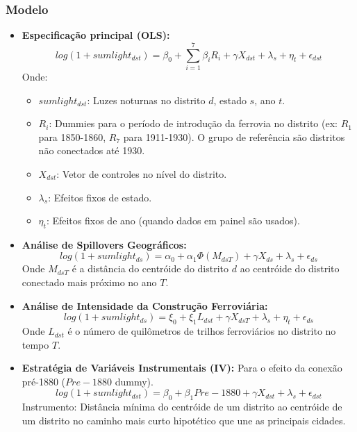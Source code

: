 \documentclass[12pt]{article}
\begin{document}
\subsubsection*{Modelo}
\begin{itemize}
    \item \textbf{Especificação principal (OLS):}
    \begin{equation} \label{eq:maitra_main}
        log(1+sumlight_{dst})=\beta_{0}+\sum_{i=1}^{7}\beta_{i}R_{i}+\gamma X_{dst}+\lambda_{s}+\eta_{t}+\epsilon_{dst}
    \end{equation}
    Onde:
    \begin{itemize}
        \item $sumlight_{dst}$: Luzes noturnas no distrito $d$, estado $s$, ano $t$.
        \item $R_i$: Dummies para o período de introdução da ferrovia no distrito (ex: $R_1$ para 1850-1860, $R_7$ para 1911-1930). O grupo de referência são distritos não conectados até 1930.
        \item $X_{dst}$: Vetor de controles no nível do distrito.
        \item $\lambda_s$: Efeitos fixos de estado.
        \item $\eta_t$: Efeitos fixos de ano (quando dados em painel são usados).
    \end{itemize}
    \item \textbf{Análise de Spillovers Geográficos:}
    \begin{equation} \label{eq:maitra_spillover}
        log(1+sumlight_{ds})=\alpha_{0}+\alpha_{1}\Phi(M_{dsT})+\gamma X_{ds}+\lambda_{s}+\epsilon_{ds}
    \end{equation}
    Onde $M_{dsT}$ é a distância do centróide do distrito $d$ ao centróide do distrito conectado mais próximo no ano $T$.
    \item \textbf{Análise de Intensidade da Construção Ferroviária:}
    \begin{equation} \label{eq:maitra_intensity}
        log(1+sumlight_{ds})=\xi_{0}+\xi_{1}L_{dst}+\gamma X_{dsT}+\lambda_{s}+\eta_{t}+\epsilon_{ds}
    \end{equation}
    Onde $L_{dst}$ é o número de quilômetros de trilhos ferroviários no distrito no tempo $T$.
    \item \textbf{Estratégia de Variáveis Instrumentais (IV):} Para o efeito da conexão pré-1880 ($Pre-1880$ dummy).
    \begin{equation} \label{eq:maitra_iv}
        log(1+sumlight_{dst})=\beta_{0}+\beta_{1}Pre-1880+\gamma X_{dst}+\lambda_{s}+\epsilon_{dst}
    \end{equation}
    Instrumento: Distância mínima do centróide de um distrito ao centróide de um distrito no caminho mais curto hipotético que une as principais cidades.
\end{itemize}
\end{document}
